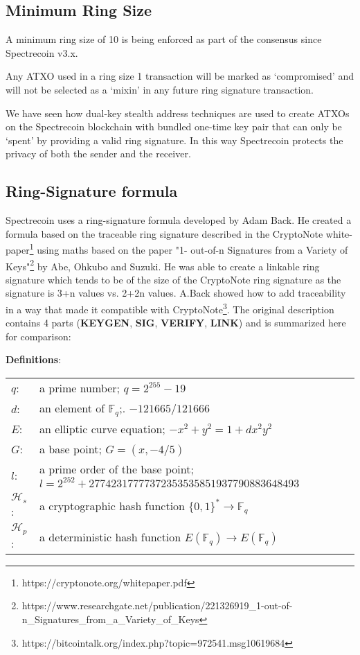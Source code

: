 \subsection{Minimum Ring Size}

A minimum ring size of 10 is being enforced as part of the consensus since Spectrecoin v3.x.



Any ATXO used in a ring size 1 transaction will be marked as ‘compromised’ and will not be selected as a
‘mixin’ in any future ring signature transaction.



We have seen how dual-key stealth address techniques are used to create ATXOs on the Spectrecoin
blockchain with bundled one-time key pair that can only be ‘spent’ by providing a valid ring signature.
In this way Spectrecoin protects the privacy of both the sender and the receiver.



\subsection{Ring-Signature formula}
Spectrecoin uses a ring-signature formula developed by Adam Back. He created a formula based on the
traceable ring signature described in the CryptoNote white-paper\footnote{https://cryptonote.org/whitepaper.pdf} using maths based on the paper "1-
out-of-n Signatures from a Variety of Keys"\footnote{https://www.researchgate.net/publication/221326919\_1-out-of-n\_Signatures\_from\_a\_Variety\_of\_Keys} by Abe, Ohkubo and Suzuki. He was able to create a linkable ring signature which tends to be  of the size of the CryptoNote ring signature as the signature is 3+n
values vs. 2+2n values. A.Back showed how to add traceability in a way that made it compatible with CryptoNote\footnote{https://bitcointalk.org/index.php?topic=972541.msg10619684}. The original description contains 4 parts (\textbf{KEYGEN}, \textbf{SIG}, \textbf{VERIFY}, \textbf{LINK}) and is summarized here for comparison:


\hfill \break\textbf{Definitions}:
 
\begin{tabular}{ll}
	$q$:   & a prime number; $q = 2^{255} - 19$\\
	$d$:   & an element of $\mathbb{F}_q$;. $-121665/121666$ \\
	$E$:   & an elliptic curve equation; $-x^2 + y^2 = 1 + dx^2y^2$ \\
	$G$:   & a base point; $G=(x, -4/5)$ \\
	$l$:   & a prime order of the base point; $l=2^{252}+27742317777372353535851937790883648493$ \\
	$\mathcal{H}_s$:   & a cryptographic hash function $\{0,1\}^* \rightarrow \mathbb{F}_q$ \\
	$\mathcal{H}_p$:   & a deterministic hash function $E(\mathbb{F}_q) \rightarrow E(\mathbb{F}_q)$ \\	
\end{tabular}

